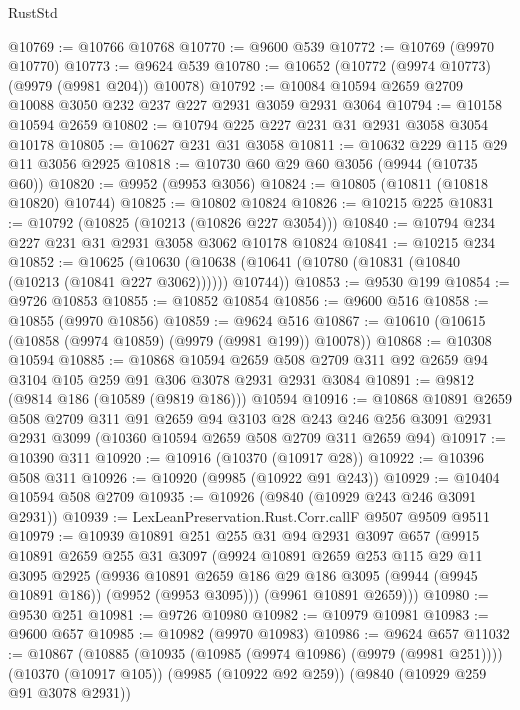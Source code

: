 \begin{lexlean}{RustStd}
\begin{coremodule}
@10769 := @10766 @10768
@10770 := @9600 @539
@10772 := @10769 (@9970 @10770)
@10773 := @9624 @539
@10780 := @10652 (@10772 (@9974 @10773) (@9979 (@9981 @204)) @10078)
@10792 := @10084 @10594 @2659 @2709 @10088 @3050 @232 @237 @227 @2931 @3059 @2931 @3064
@10794 := @10158 @10594 @2659
@10802 := @10794 @225 @227 @231 @31 @2931 @3058 @3054 @10178
@10805 := @10627 @231 @31 @3058
@10811 := @10632 @229 @115 @29 @11 @3056 @2925
@10818 := @10730 @60 @29 @60 @3056 (@9944 (@10735 @60))
@10820 := @9952 (@9953 @3056)
@10824 := @10805 (@10811 (@10818 @10820) @10744)
@10825 := @10802 @10824
@10826 := @10215 @225
@10831 := @10792 (@10825 (@10213 (@10826 @227 @3054)))
@10840 := @10794 @234 @227 @231 @31 @2931 @3058 @3062 @10178 @10824
@10841 := @10215 @234
@10852 := @10625
    (@10630 (@10638 (@10641 (@10780 (@10831 (@10840 (@10213 (@10841 @227 @3062)))))) @10744))
@10853 := @9530 @199
@10854 := @9726 @10853
@10855 := @10852 @10854
@10856 := @9600 @516
@10858 := @10855 (@9970 @10856)
@10859 := @9624 @516
@10867 := @10610 (@10615 (@10858 (@9974 @10859) (@9979 (@9981 @199)) @10078))
@10868 := @10308 @10594
@10885 := @10868
    @10594
    @2659
    @508
    @2709
    @311
    @92
    @2659
    @94
    @3104
    @105
    @259
    @91
    @306
    @3078
    @2931
    @2931
    @3084
@10891 := @9812 (@9814 @186 (@10589 (@9819 @186))) @10594
@10916 := @10868
    @10891
    @2659
    @508
    @2709
    @311
    @91
    @2659
    @94
    @3103
    @28
    @243
    @246
    @256
    @3091
    @2931
    @2931
    @3099
    (@10360 @10594 @2659 @508 @2709 @311 @2659 @94)
@10917 := @10390 @311
@10920 := @10916 (@10370 (@10917 @28))
@10922 := @10396 @508 @311
@10926 := @10920 (@9985 (@10922 @91 @243))
@10929 := @10404 @10594 @508 @2709
@10935 := @10926 (@9840 (@10929 @243 @246 @3091 @2931))
@10939 := LexLeanPreservation.Rust.Corr.callF @9507 @9509 @9511
@10979 := @10939
    @10891
    @251
    @255
    @31
    @94
    @2931
    @3097
    @657
    (@9915
      @10891
      @2659
      @255
      @31
      @3097
      (@9924
        @10891
        @2659
        @253
        @115
        @29
        @11
        @3095
        @2925
        (@9936 @10891 @2659 @186 @29 @186 @3095 (@9944 (@9945 @10891 @186)) (@9952 (@9953 @3095)))
        (@9961 @10891 @2659)))
@10980 := @9530 @251
@10981 := @9726 @10980
@10982 := @10979 @10981
@10983 := @9600 @657
@10985 := @10982 (@9970 @10983)
@10986 := @9624 @657
@11032 := @10867
    (@10885
      (@10935 (@10985 (@9974 @10986) (@9979 (@9981 @251))))
      (@10370 (@10917 @105))
      (@9985 (@10922 @92 @259))
      (@9840 (@10929 @259 @91 @3078 @2931))

\end{coremodule}
\end{lexlean}
